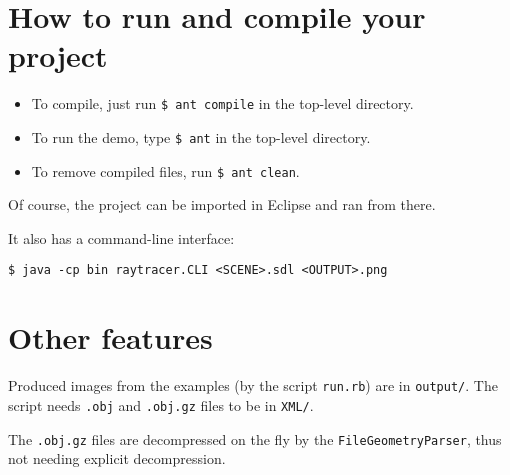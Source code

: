 \documentclass[a4paper,11pt]{article}
\begin{document}
\section{How to run and compile your project}

\begin{itemize}
  \item To compile, just run \texttt{\$ ant compile} in the top-level directory.
  \item To run the demo, type \texttt{\$ ant} in the top-level directory.
  \item To remove compiled files, run \texttt{\$ ant clean}.
\end{itemize}

Of course, the project can be imported in Eclipse and ran from there.

It also has a command-line interface:
\begin{verbatim}
$ java -cp bin raytracer.CLI <SCENE>.sdl <OUTPUT>.png
\end{verbatim}

\section{Other features}

Produced images from the examples (by the script \texttt{run.rb}) are in \texttt{output/}.
The script needs \texttt{.obj} and \texttt{.obj.gz} files to be in \texttt{XML/}.

The \texttt{.obj.gz} files are decompressed on the fly by the \texttt{FileGeometryParser}, thus not needing explicit decompression.
\end{document}
